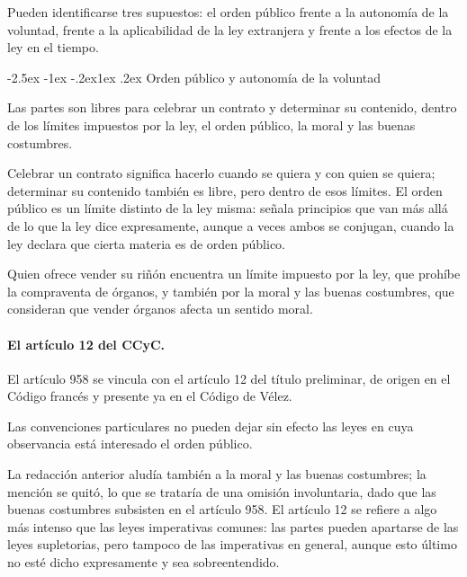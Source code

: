 \documentclass[12pt,oneside]{book}
\makeatletter
\renewcommand\subsection{\@startsection{subsection}{2}{\z@}%
  {-2.5ex \@plus -1ex \@minus -.2ex}{1ex \@plus .2ex}%
  {\normalfont\normalsize\bfseries}}
\makeatother
\begin{document}
Pueden identificarse tres supuestos: el orden público frente a la autonomía de la voluntad, frente a la aplicabilidad de la ley extranjera y frente a los efectos de la ley en el tiempo.

\subsection{Orden público y autonomía de la voluntad}

\begin{regla}
Las partes son libres para celebrar un contrato y determinar su contenido, dentro de los límites impuestos por la ley, el orden público, la moral y las buenas costumbres.
\end{regla}

Celebrar un contrato significa hacerlo cuando se quiera y con quien se quiera; determinar su contenido también es libre, pero dentro de esos límites. El orden público es un límite distinto de la ley misma: señala principios que van más allá de lo que la ley dice expresamente, aunque a veces ambos se conjugan, cuando la ley declara que cierta materia es de orden público.

\begin{ejemplo}
Quien ofrece vender su riñón encuentra un límite impuesto por la ley, que prohíbe la compraventa de órganos, y también por la moral y las buenas costumbres, que consideran que vender órganos afecta un sentido moral.
\end{ejemplo}

\paragraph{El artículo 12 del CCyC.} El artículo 958 se vincula con el artículo 12 del título preliminar, de origen en el Código francés y presente ya en el Código de Vélez.

\begin{regla}
Las convenciones particulares no pueden dejar sin efecto las leyes en cuya observancia está interesado el orden público.
\end{regla}

La redacción anterior aludía también a la moral y las buenas costumbres; la mención se quitó, lo que se trataría de una omisión involuntaria, dado que las buenas costumbres subsisten en el artículo 958. El artículo 12 se refiere a algo más intenso que las leyes imperativas comunes: las partes pueden apartarse de las leyes supletorias, pero tampoco de las imperativas en general, aunque esto último no esté dicho expresamente y sea sobreentendido.
\end{document}
